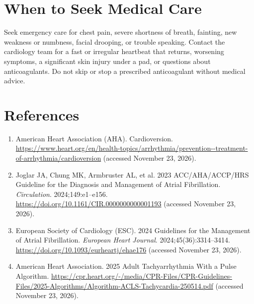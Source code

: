 \section*{When to Seek Medical Care}
Seek emergency care for chest pain, severe shortness of breath, fainting, new weakness or numbness, facial drooping, or trouble speaking. Contact the cardiology team for a fast or irregular heartbeat that returns, worsening symptoms, a significant skin injury under a pad, or questions about anticoagulants. Do not skip or stop a prescribed anticoagulant without medical advice.

\section*{References}
\begin{enumerate}
  \item American Heart Association (AHA). Cardioversion. \url{https://www.heart.org/en/health-topics/arrhythmia/prevention--treatment-of-arrhythmia/cardioversion} (accessed November 23, 2026).
  \item Joglar JA, Chung MK, Armbruster AL, et al. 2023 ACC/AHA/ACCP/HRS Guideline for the Diagnosis and Management of Atrial Fibrillation. \textit{Circulation}. 2024;149:e1--e156. \url{https://doi.org/10.1161/CIR.0000000000001193} (accessed November 23, 2026).
  \item European Society of Cardiology (ESC). 2024 Guidelines for the Management of Atrial Fibrillation. \textit{European Heart Journal}. 2024;45(36):3314--3414. \url{https://doi.org/10.1093/eurheartj/ehae176} (accessed November 23, 2026).
  \item American Heart Association. 2025 Adult Tachyarrhythmia With a Pulse Algorithm. \url{https://cpr.heart.org/-/media/CPR-Files/CPR-Guidelines-Files/2025-Algorithms/Algorithm-ACLS-Tachycardia-250514.pdf} (accessed November 23, 2026).
\end{enumerate}

\clearpage
